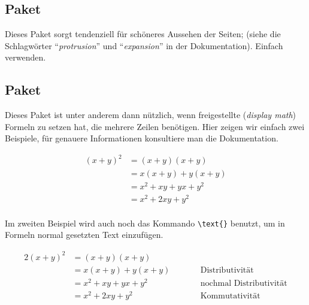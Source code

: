 \subsection{Paket }

Dieses Paket sorgt tendenziell für schöneres Aussehen der Seiten; (siehe die
Schlagwörter "`\emph{protrusion}"' und "`\emph{expansion}"' in der
Dokumentation). Einfach verwenden.

\subsection{Paket }

Dieses Paket ist unter anderem dann nützlich, wenn freigestellte
(\emph{display math}) Formeln zu setzen hat, die mehrere Zeilen benötigen.
Hier zeigen wir einfach zwei Beispiele, für genauere Informationen konsultiere
man die Dokumentation. 

\begin{tcblisting}{}
  \begin{align*}
    (x+y)^2 &= (x+y) (x+y) \\
            &= x(x+y) + y(x+y) \\
            &= x^2 + xy + yx + y^2 \\
            &= x^2 + 2xy + y^2 \\
  \end{align*}
\end{tcblisting}

Im zweiten Beispiel wird auch noch das Kommando
\verb|\text{|\verb|}| benutzt, um in Formeln normal gesetzten Text
einzufügen.

\begin{tcblisting}{}
  \begin{alignat*}{2}
    (x+y)^2 
    &= (x+y) (x+y)          \\
    &= x(x+y) + y(x+y)      &\qquad& \text{Distributivität} \\
    &= x^2 + xy + yx + y^2  && \text{nochmal Distributivität}\\
    &= x^2 + 2xy + y^2      && \text{Kommutativität}\\
  \end{alignat*}
\end{tcblisting}

